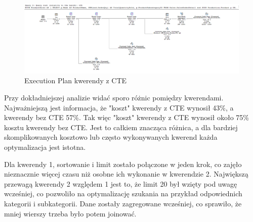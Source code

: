 \documentclass[a4paper,12pt]{article}
\begin{document}
\begin{figure}[H]
  \centering
  \includegraphics[width=1.0\textwidth]{images/query_2_plan.png}
  \caption{Execution Plan kwerendy z CTE}
\end{figure}

Przy dokładniejszej analizie widać sporo różnic pomiędzy kwerendami. Najważniejszą jest informacja, że "koszt" kwerendy z CTE wynosił 43\%, a kwerendy bez CTE 57\%. Tak więc "koszt" kwerendy z CTE wynosił około 75\% kosztu kwerendy bez CTE. Jest to całkiem znacząca różnica, a dla bardziej skomplikowanych kosztowo lub często wykonywanych kwerend każda optymalizacja jest istotna.

Dla kwerendy 1, sortowanie i limit zostało połączone w jeden krok, co zajęło nieznacznie więcej czasu niż osobne ich wykonanie w kwerendzie 2. Największą przewagą kwerendy 2 względem 1 jest to, że limit 20 był wzięty pod uwagę wcześniej, co pozwoliło na optymalizację szukania na przykład odpowiednich kategorii i subkategorii. Dane zostały zagregowane wcześniej, co sprawiło, że mniej wierszy trzeba było potem joinować.
\end{document}
